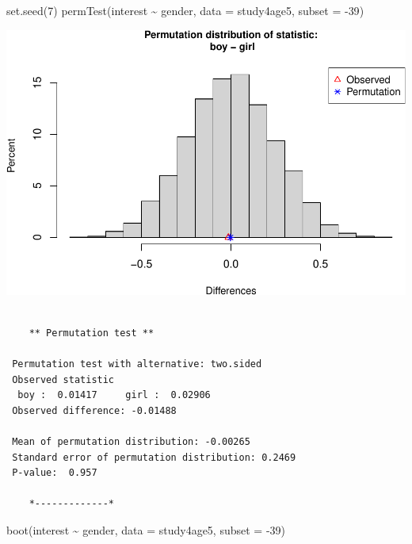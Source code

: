 \documentclass[
]{book}
\newenvironment{Shaded}{\begin{snugshade}}{\end{snugshade}}
\newcommand{\AttributeTok}[1]{\textcolor[rgb]{0.77,0.63,0.00}{#1}}
\newcommand{\DecValTok}[1]{\textcolor[rgb]{0.00,0.00,0.81}{#1}}
\newcommand{\FunctionTok}[1]{\textcolor[rgb]{0.00,0.00,0.00}{#1}}
\newcommand{\NormalTok}[1]{#1}
\newcommand{\SpecialCharTok}[1]{\textcolor[rgb]{0.00,0.00,0.00}{#1}}
\begin{document}
\begin{Shaded}
\begin{Highlighting}[]
\FunctionTok{set.seed}\NormalTok{(}\DecValTok{7}\NormalTok{)}
\FunctionTok{permTest}\NormalTok{(interest }\SpecialCharTok{\textasciitilde{}}\NormalTok{ gender, }\AttributeTok{data =}\NormalTok{ study4age5, }\AttributeTok{subset =} \SpecialCharTok{{-}}\DecValTok{39}\NormalTok{)}
\end{Highlighting}
\end{Shaded}

\includegraphics[width=1\linewidth]{Class_Activity_14_files/figure-latex/unnamed-chunk-13-1}

\begin{verbatim}

    ** Permutation test **

 Permutation test with alternative: two.sided 
 Observed statistic
  boy :  0.01417     girl :  0.02906 
 Observed difference: -0.01488 

 Mean of permutation distribution: -0.00265 
 Standard error of permutation distribution: 0.2469 
 P-value:  0.957 

    *-------------*
\end{verbatim}

\begin{Shaded}
\begin{Highlighting}[]
\FunctionTok{boot}\NormalTok{(interest }\SpecialCharTok{\textasciitilde{}}\NormalTok{ gender, }\AttributeTok{data =}\NormalTok{ study4age5, }\AttributeTok{subset =} \SpecialCharTok{{-}}\DecValTok{39}\NormalTok{)}
\end{Highlighting}
\end{Shaded}
\end{document}
